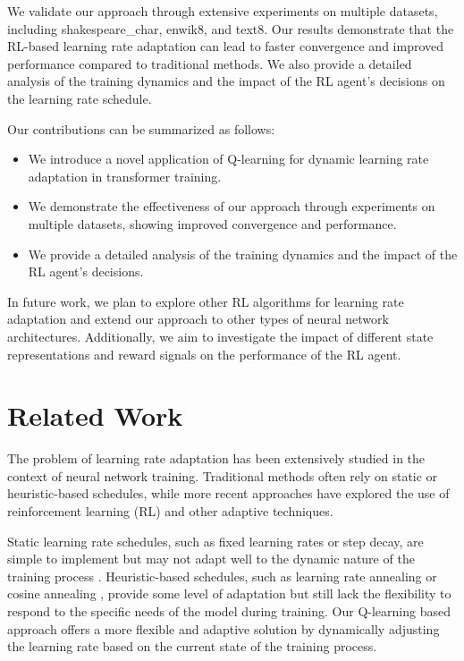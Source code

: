 \documentclass{article} %
\begin{document}
We validate our approach through extensive experiments on multiple datasets, including shakespeare\_char, enwik8, and text8. Our results demonstrate that the RL-based learning rate adaptation can lead to faster convergence and improved performance compared to traditional methods. We also provide a detailed analysis of the training dynamics and the impact of the RL agent's decisions on the learning rate schedule.

Our contributions can be summarized as follows:
\begin{itemize}
    \item We introduce a novel application of Q-learning for dynamic learning rate adaptation in transformer training.
    \item We demonstrate the effectiveness of our approach through experiments on multiple datasets, showing improved convergence and performance.
    \item We provide a detailed analysis of the training dynamics and the impact of the RL agent's decisions.
\end{itemize}

In future work, we plan to explore other RL algorithms for learning rate adaptation and extend our approach to other types of neural network architectures. Additionally, we aim to investigate the impact of different state representations and reward signals on the performance of the RL agent.

\section{Related Work}
\label{sec:related}

The problem of learning rate adaptation has been extensively studied in the context of neural network training. Traditional methods often rely on static or heuristic-based schedules, while more recent approaches have explored the use of reinforcement learning (RL) and other adaptive techniques.

Static learning rate schedules, such as fixed learning rates or step decay, are simple to implement but may not adapt well to the dynamic nature of the training process \citep{goodfellow2016deep}. Heuristic-based schedules, such as learning rate annealing or cosine annealing \citep{loshchilov2016sgdr}, provide some level of adaptation but still lack the flexibility to respond to the specific needs of the model during training. Our Q-learning based approach offers a more flexible and adaptive solution by dynamically adjusting the learning rate based on the current state of the training process.
\end{document}
